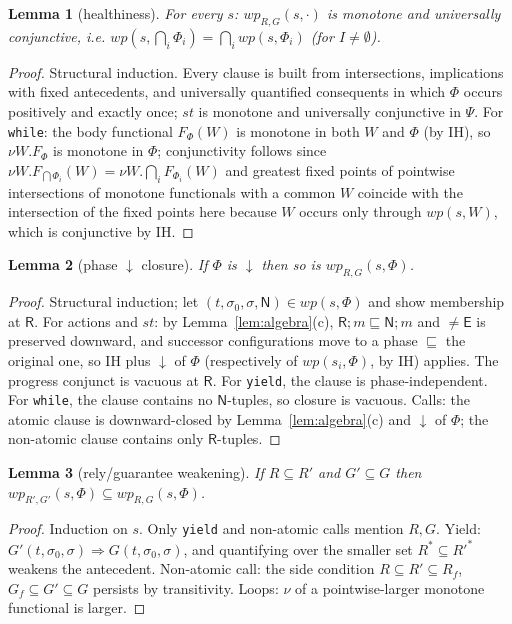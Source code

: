 \documentclass[11pt]{article}
\theoremstyle{plain}
\newtheorem{lemma}{Lemma}
\theoremstyle{plain}
\theoremstyle{definition}
\newcommand{\MR}{\mathsf{R}}
\newcommand{\MN}{\mathsf{N}}
\newcommand{\ME}{\mathsf{E}}
\newcommand{\sq}{\sqsubseteq}
\newcommand{\wpx}{\mathit{wp}}
\newcommand{\stp}{\mathit{st}}
\newcommand{\dcl}{\ensuremath{\downarrow}\text{-closed}}
\newcommand{\code}[1]{\texttt{#1}}
\begin{document}
\begin{lemma}[healthiness]\label{lem:healthy}
For every $s$: $\wpx_{R,G}(s,\cdot)$ is monotone and universally conjunctive, i.e.
$\wpx(s,\bigcap_{i}\Phi_i) = \bigcap_i \wpx(s,\Phi_i)$ (for $I \ne \emptyset$).
\end{lemma}
\begin{proof}
Structural induction. Every clause is built from intersections, implications with
fixed antecedents, and universally quantified consequents in which $\Phi$ occurs
positively and exactly once; $\stp$ is monotone and universally conjunctive in
$\Psi$. For \code{while}: the body functional $F_\Phi(W)$ is monotone in both $W$
and $\Phi$ (by IH), so $\nu W.F_\Phi$ is monotone in $\Phi$; conjunctivity follows
since $\nu W.F_{\bigcap\Phi_i}(W) = \nu W.\bigcap_i F_{\Phi_i}(W)$ and greatest
fixed points of pointwise intersections of monotone functionals with a common $W$
coincide with the intersection of the fixed points here because $W$ occurs only
through $\wpx(s,W)$, which is conjunctive by IH.
\end{proof}

\begin{lemma}[phase \dcl{} closure]\label{lem:down}
If $\Phi$ is \dcl{} then so is $\wpx_{R,G}(s,\Phi)$.
\end{lemma}
\begin{proof}
Structural induction; let $(t,\sigma_0,\sigma,\MN)\in\wpx(s,\Phi)$ and show
membership at $\MR$. For actions and $\stp$: by Lemma~\ref{lem:algebra}(c),
$\MR;m\sq\MN;m$ and $\neq\ME$ is preserved downward, and successor configurations
move to a phase $\sq$ the original one, so IH plus \dcl{} of $\Phi$ (respectively
of $\wpx(s_i,\Phi)$, by IH) applies. The progress conjunct is vacuous at $\MR$. For
\code{yield}, the clause is phase-independent. For \code{while}, the clause
contains no $\MN$-tuples, so closure is vacuous. Calls: the atomic clause is
downward-closed by Lemma~\ref{lem:algebra}(c) and \dcl{} of $\Phi$; the non-atomic
clause contains only $\MR$-tuples.
\end{proof}

\begin{lemma}[rely/guarantee weakening]\label{lem:weaken}
If $R\subseteq R'$ and $G'\subseteq G$ then
$\wpx_{R',G'}(s,\Phi) \subseteq \wpx_{R,G}(s,\Phi)$.
\end{lemma}
\begin{proof}
Induction on $s$. Only \code{yield} and non-atomic calls mention $R,G$. Yield:
$G'(t,\sigma_0,\sigma)\Rightarrow G(t,\sigma_0,\sigma)$, and quantifying over the
smaller set $R^*\subseteq R'^*$ weakens the antecedent. Non-atomic call: the side
condition $R\subseteq R'\subseteq R_f$, $G_f\subseteq G'\subseteq G$ persists by
transitivity. Loops: $\nu$ of a pointwise-larger monotone functional is larger.
\end{proof}
\end{document}
